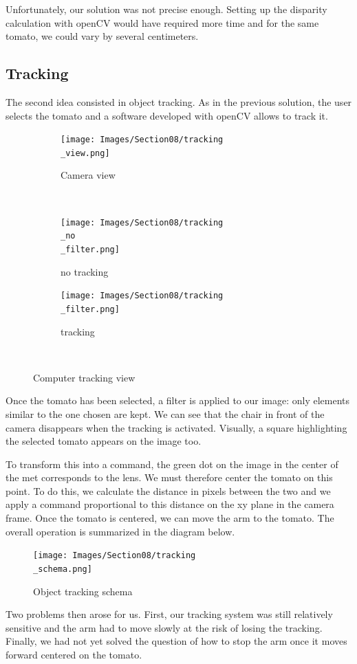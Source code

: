 \bigbreak
Unfortunately, our solution was not precise enough. Setting up the disparity calculation with openCV would have required more time and for the same tomato, we could vary by several centimeters.

\subsection{Tracking}

The second idea consisted in object tracking. As in the previous solution, the user selects the tomato and a software developed with openCV allows to track it.
\begin{figure}[H]
    \begin{subfigure}{\linewidth}
        \centering
        \texttt{[image: Images/Section08/tracking\\\_view.png]}
        \caption{Camera view}
        \label{fig:View}
    \end{subfigure}\\[1ex]
    \begin{subfigure}{.5\linewidth}
        \centering
        \texttt{[image: Images/Section08/tracking\\\_no\\\_filter.png]}
        \caption{no tracking}
        \label{fig:notracking}
    \end{subfigure}%
    \begin{subfigure}{.5\linewidth}
        \centering
        \texttt{[image: Images/Section08/tracking\\\_filter.png]}
        \caption{tracking}
        \label{fig:tracking}
    \end{subfigure}\\[1ex]
    \caption{Computer tracking view}
    \label{fig:trackingView}
\end{figure}
\FloatBarrier

Once the tomato has been selected, a filter is applied to our image: only elements similar to the one chosen are kept. We can see that the chair in front of the camera disappears when the tracking is activated. Visually, a square highlighting the selected tomato appears on the image too.

\bigbreak
To transform this into a command, the green dot on the image in the center of the met corresponds to the lens. We must therefore center the tomato on this point. To do this, we calculate the distance in pixels between the two and we apply a command proportional to this distance on the xy plane in the camera frame. Once the tomato is centered, we can move the arm to the tomato. The overall operation is summarized in the diagram below.

\begin{figure}[H]
    \centering
    \texttt{[image: Images/Section08/tracking\\\_schema.png]}
    \caption{Object tracking schema}
    \label{fig:TrackingSchema}
\end{figure}
\FloatBarrier

Two problems then arose for us. First, our tracking system was still relatively sensitive and the arm had to move slowly at the risk of losing the tracking. Finally, we had not yet solved the question of how to stop the arm once it moves forward centered on the tomato. 